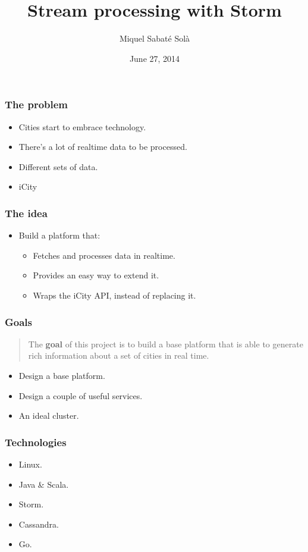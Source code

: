 \documentclass[12pt]{beamer}
\title{Stream processing with Storm}
\author{Miquel Sabaté Solà}
\date{June 27, 2014}
\begin{document}
\frame{\titlepage}


\begin{frame}
\vfill
  \frametitle{The problem}
  \begin{itemize}
    \item Cities start to embrace technology.
    \vfill
    \item There's a lot of realtime data to be processed.
    \vfill
    \item Different sets of data.
    \vfill
    \item iCity
    \vfill
  \end{itemize}
\vfill
\end{frame}

\begin{frame}
\vfill
  \frametitle{The idea}
  \begin{itemize}
    \item Build a platform that:
    \vfill
    \begin{itemize}
      \item Fetches and processes data in realtime.
      \vfill
      \item Provides an easy way to extend it.
      \vfill
      \item Wraps the iCity API, instead of replacing it.
    \end{itemize}
  \end{itemize}
\vfill
\end{frame}

\begin{frame}
\vfill
  \frametitle{Goals}
  \begin{quotation}
    The {\bf goal} of this project is to build a base platform that is able to
generate rich information about a set of cities in real time.
  \end{quotation}

  \begin{itemize}
    \item Design a base platform.
    \vfill
    \item Design a couple of useful services.
    \vfill
    \item An ideal cluster.
  \end{itemize}
\vfill
\end{frame}

\begin{frame}
\vfill
  \frametitle{Technologies}
  \begin{itemize}
    \item Linux.
    \vfill
    \item Java \& Scala.
    \vfill
    \item Storm.
    \vfill
    \item Cassandra.
    \vfill
    \item Go.
    \vfill
  \end{itemize}
\vfill
\end{frame}
\end{document}
